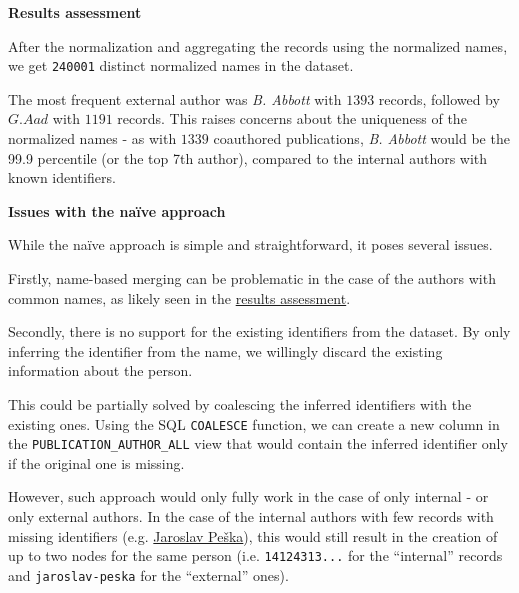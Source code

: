 \textbf{Results assessment}\label{sec:results-assessment}

After the normalization and aggregating the records using the normalized names,
we get \texttt{240001} distinct normalized names in the dataset.

The most frequent external author was \textit{B. Abbott} with $1393$ records, followed by $G. Aad$ with $1191$ records.
This raises concerns about the uniqueness of the normalized names - as with $1339$ coauthored publications, \textit{B. Abbott} would be the 99.9 percentile (or the top 7th author),
compared to the internal authors with known identifiers.

\textbf{Issues with the naïve approach}

While the naïve approach is simple and straightforward, it poses several issues.

Firstly, name-based merging can be problematic in the case of the authors with common names, as likely seen in the \hyperref[sec:results-assessment]{results assessment}.

Secondly, there is no support for the existing identifiers from the dataset.
By only inferring the identifier from the name, we willingly discard the existing information about the person.

This could be partially solved by coalescing the inferred identifiers with the existing ones.
Using the SQL \texttt{COALESCE} function, we can create a new column in the \texttt{PUBLICATION\_AUTHOR\_ALL} view that would contain the inferred identifier only if the original one is missing.

However, such approach would only fully work in the case of only internal - or only external authors.
In the case of the internal authors with few records with missing identifiers (e.g. \hyperref[fig:jaroslav-peska]{Jaroslav Peška}),
this would still result in the creation of up to two nodes for the same person (i.e. \texttt{14124313...} for the ``internal'' records and \texttt{jaroslav-peska} for the ``external'' ones).

